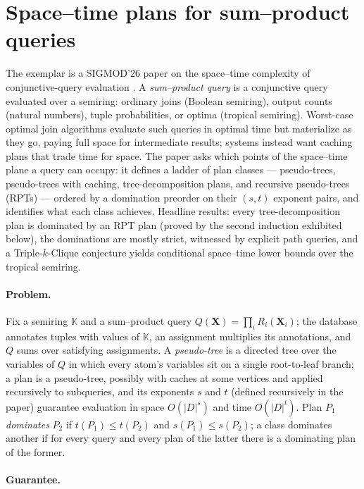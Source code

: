 \section{Space--time plans for sum--product queries}
\label{sec:ind-sumprod}

The exemplar is a SIGMOD'26 paper on the space--time complexity of conjunctive-query
evaluation \citep{sigmod26-371}. A \emph{sum--product query} is a conjunctive query
evaluated over a semiring: ordinary joins (Boolean semiring), output counts (natural
numbers), tuple probabilities, or optima (tropical semiring). Worst-case optimal join
algorithms evaluate such queries in optimal time but materialize as they go, paying
full space for intermediate results; systems instead want caching plans that trade
time for space. The paper asks which points of the space--time plane a query can
occupy: it defines a ladder of plan classes --- pseudo-trees, pseudo-trees with
caching, tree-decomposition plans, and recursive pseudo-trees (RPTs) --- ordered by a
domination preorder on their $(s,t)$ exponent pairs, and identifies what each class
achieves. Headline results: every tree-decomposition plan is dominated by an RPT plan
(proved by the second induction exhibited below), the dominations are mostly strict,
witnessed by explicit path queries, and a Triple-$k$-Clique conjecture yields
conditional space--time lower bounds over the tropical semiring.

\paragraph{Problem.}
Fix a semiring $\mathbb{K}$ and a sum--product query
$Q(\mathbf{X}) = \prod_{i} R_i(\mathbf{X}_i)$; the database annotates tuples with
values of $\mathbb{K}$, an assignment multiplies its annotations, and $Q$ sums over
satisfying assignments. A \emph{pseudo-tree} is a directed tree over the variables of
$Q$ in which every atom's variables sit on a single root-to-leaf branch; a plan is a
pseudo-tree, possibly with caches at some vertices and applied recursively to
subqueries, and its exponents $s$ and $t$ (defined recursively in the paper) guarantee
evaluation in space $O(|D|^{s})$ and time $O(|D|^{t})$. Plan $P_1$ \emph{dominates}
$P_2$ if $t(P_1) \le t(P_2)$ and $s(P_1) \le s(P_2)$; a class dominates another if for
every query and every plan of the latter there is a dominating plan of the former.

\paragraph{Guarantee.}

